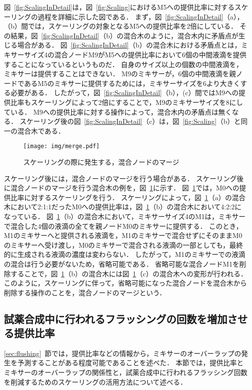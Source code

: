 図~\ref{fig:ScalingInDetail}は，図~\ref{fig:Scaling}におけるM5への提供比率に対するスケーリングの過程を詳細に示した図である．
まず，図~\ref{fig:ScalingInDetail}（a），（b）間では，スケーリングの対象となるM5への提供比率を2倍にしている．
その結果，図~\ref{fig:ScalingInDetail}（b）の混合木のように，混合木内に矛盾点が生じる場合がある．
図~\ref{fig:ScalingInDetail}（b）の混合木における矛盾点とは，ミキサーサイズ4の混合ノードM9がM5への提供比率において6個の中間液滴を提供することになっているというものだ．
自身のサイズ以上の個数の中間液滴を，ミキサーは提供することはできない．
M9のミキサーが，6個の中間液滴を親ノードであるM5のミキサーに提供するためには，ミキサーサイズを6より大きくする必要がある．
したがって，図~\ref{fig:ScalingInDetail}（b），(c）間ではM9への提供比率もスケーリングによって2倍にすることで，M9のミキサーサイズを8にしている．
M9への提供比率に対する操作によって，混合木内の矛盾点は無くなる．
スケーリング後の図~\ref{fig:ScalingInDetail}（c）は，図~\ref{fig:Scaling}（b）と同一の混合木である．

\begin{figure}[tbp]
 \centering\texttt{[image: img/merge.pdf]}
 \caption{スケーリングの際に発生する，混合ノードのマージ}\label{fig:Merge}
\end{figure}

スケーリング後には，混合ノードのマージを行う場合がある．
スケーリング後に混合ノードのマージを行う混合木の例を，図~\ref{fig:Merge}に示す．
図~\ref{fig:Merge}では，M0への提供比率に対するスケーリングを行う．
スケーリングによって，図~\ref{fig:Merge}（a）の混合木において2:1:1だったM0への提供比率は，図~\ref{fig:Merge}（b）の混合木において4:2:2になっている．
図~\ref{fig:Merge}（b）の混合木において，ミキサーサイズ4のM1は，ミキサーで混合した4個の液滴の全てを親ノードM0のミキサーに提供する．
このとき，M1のミキサーへと提供される液滴を，M1のミキサーで混合せずにそのままM0のミキサーへ受け渡し，M0のミキサーで混合される液滴の一部としても，最終的に生成される液滴の濃度は変わらない．
したがって，M1のミキサーでの液滴の混合は行う必要がないため，省略可能である．
省略可能な混合ノードM1を削除することで，図~\ref{fig:Merge}（b）の混合木には図~\ref{fig:Merge}（c）の混合木への変形が行われる．
このように，スケーリングに伴って，省略可能になった混合ノードを混合木から削除する操作のことを，混合ノードのマージという．

\subsection{試薬合成中に行われるフラッシングの回数を増加させる提供比率}\label{ratio}
\ref{sec:flushing}~節では，提供比率などの情報から，ミキサーのオーバーラップの発生を予測することがある程度可能であることを述べた．
本節では，提供比率とミキサーのオーバーラップの関係性と，試薬合成中に行われるフラッシング回数を削減するためのスケーリングの活用方法について述べる．

